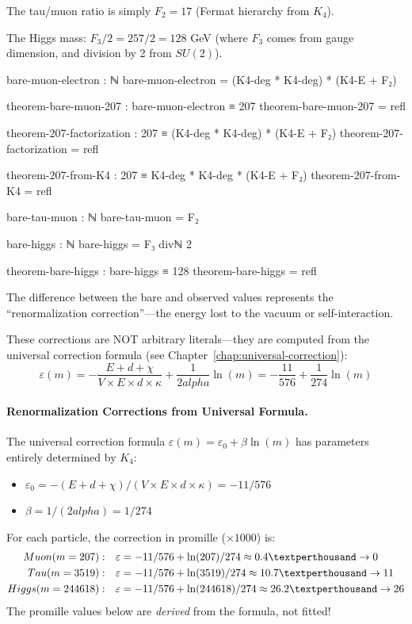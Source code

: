 \documentclass[11pt,a4paper]{book}
\newcommand{\permil}{\text{\textperthousand}}
\def\alpha{alpha}%
\def\mathrm#1{#1}%
\def\text#1{#1}%
\begin{document}
The tau/muon ratio is simply $F_2 = 17$ (Fermat hierarchy from $K_4$).

The Higgs mass: $F_3/2 = 257/2 = 128$ GeV (where $F_3$ comes from gauge dimension, and division by 2 from $\mathrm{SU}(2)$).

\begin{code}
bare-muon-electron : ℕ
bare-muon-electron = (K4-deg * K4-deg) * (K4-E + F₂)

theorem-bare-muon-207 : bare-muon-electron ≡ 207
theorem-bare-muon-207 = refl

theorem-207-factorization : 207 ≡ (K4-deg * K4-deg) * (K4-E + F₂)
theorem-207-factorization = refl

theorem-207-from-K4 : 207 ≡ K4-deg * K4-deg * (K4-E + F₂)
theorem-207-from-K4 = refl

bare-tau-muon : ℕ
bare-tau-muon = F₂

bare-higgs : ℕ
bare-higgs = F₃ divℕ 2

theorem-bare-higgs : bare-higgs ≡ 128
theorem-bare-higgs = refl

\end{code}

The difference between the bare and observed values represents the ``renormalization correction''---the energy lost to the vacuum or self-interaction. 

These corrections are NOT arbitrary literals---they are computed from the universal correction formula (see Chapter~\ref{chap:universal-correction}):
\[
\varepsilon(m) = -\frac{E + d + \chi}{V \times E \times d \times \kappa} + \frac{1}{2\alpha} \ln(m) = -\frac{11}{576} + \frac{1}{274} \ln(m)
\]

\paragraph{Renormalization Corrections from Universal Formula.}
The universal correction formula $\varepsilon(m) = \varepsilon_0 + \beta \ln(m)$ has parameters entirely determined by $K_4$:
\begin{itemize}
\item $\varepsilon_0 = -(E + d + \chi)/(V \times E \times d \times \kappa) = -11/576$
\item $\beta = 1/(2\alpha) = 1/274$
\end{itemize}
For each particle, the correction in promille ($\times 1000$) is:
\begin{align*}
\text{Muon } (m=207): \quad &\varepsilon = -11/576 + \ln(207)/274 \approx 0.4\permil \to 0 \\
\text{Tau } (m=3519): \quad &\varepsilon = -11/576 + \ln(3519)/274 \approx 10.7\permil \to 11 \\
\text{Higgs } (m=244618): \quad &\varepsilon = -11/576 + \ln(244618)/274 \approx 26.2\permil \to 26
\end{align*}
The promille values below are \emph{derived} from the formula, not fitted!
\end{document}
